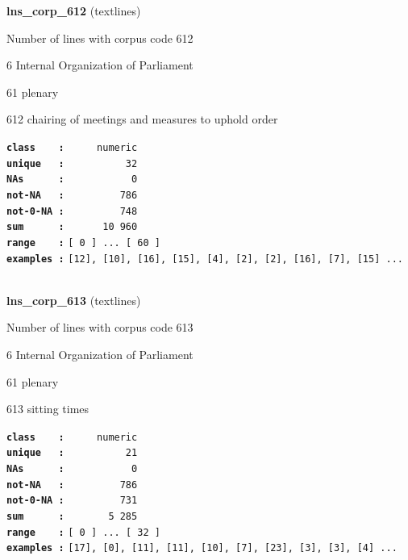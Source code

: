 \documentclass[]{article}
\begin{document}
\textbf{lns\_corp\_612} (textlines)

Number of lines with corpus code 612

6 Internal Organization of Parliament

61 plenary

612 chairing of meetings and measures to uphold order

\textbf{\texttt{class\ \ \ \ :}} \texttt{~~~~~numeric}\\
\textbf{\texttt{unique\ \ \ :}} \texttt{~~~~~~~~~~32}\\
\textbf{\texttt{NAs\ \ \ \ \ \ :}} \texttt{~~~~~~~~~~~0}\\
\textbf{\texttt{not-NA\ \ \ :}} \texttt{~~~~~~~~~786}\\
\textbf{\texttt{not-0-NA\ :}} \texttt{~~~~~~~~~748}\\
\textbf{\texttt{sum\ \ \ \ \ \ :}} \texttt{~~~~~~10~960}\\
\textbf{\texttt{range\ \ \ \ :}}
\texttt{{[}\ 0\ {]}\ ...\ {[}\ 60\ {]}}\\
\textbf{\texttt{examples\ :}}
\texttt{{[}12{]},\ {[}10{]},\ {[}16{]},\ {[}15{]},\ {[}4{]},\ {[}2{]},\ {[}2{]},\ {[}16{]},\ {[}7{]},\ {[}15{]}\ ...}\\

~

\textbf{lns\_corp\_613} (textlines)

Number of lines with corpus code 613

6 Internal Organization of Parliament

61 plenary

613 sitting times

\textbf{\texttt{class\ \ \ \ :}} \texttt{~~~~~numeric}\\
\textbf{\texttt{unique\ \ \ :}} \texttt{~~~~~~~~~~21}\\
\textbf{\texttt{NAs\ \ \ \ \ \ :}} \texttt{~~~~~~~~~~~0}\\
\textbf{\texttt{not-NA\ \ \ :}} \texttt{~~~~~~~~~786}\\
\textbf{\texttt{not-0-NA\ :}} \texttt{~~~~~~~~~731}\\
\textbf{\texttt{sum\ \ \ \ \ \ :}} \texttt{~~~~~~~5~285}\\
\textbf{\texttt{range\ \ \ \ :}}
\texttt{{[}\ 0\ {]}\ ...\ {[}\ 32\ {]}}\\
\textbf{\texttt{examples\ :}}
\texttt{{[}17{]},\ {[}0{]},\ {[}11{]},\ {[}11{]},\ {[}10{]},\ {[}7{]},\ {[}23{]},\ {[}3{]},\ {[}3{]},\ {[}4{]}\ ...}\\
\end{document}

